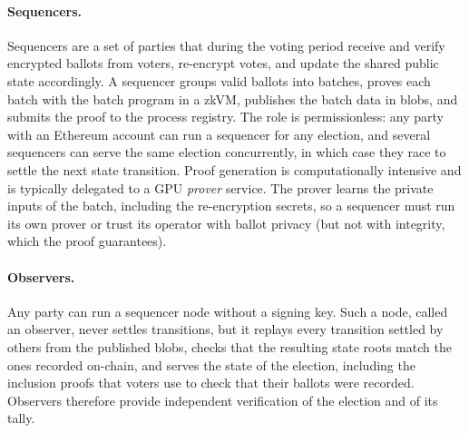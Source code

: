 \paragraph{Sequencers.} Sequencers are a set of parties that during the voting period receive and verify encrypted ballots from voters, re-encrypt votes, and update the shared public state accordingly. A sequencer groups valid ballots into batches, proves each batch with the batch program in a \ac{zkVM}, publishes the batch data in blobs, and submits the proof to the process registry. The role is permissionless: any party with an Ethereum account can run a sequencer for any election, and several sequencers can serve the same election concurrently, in which case they race to settle the next state transition. Proof generation is computationally intensive and is typically delegated to a GPU \emph{prover} service. The prover learns the private inputs of the batch, including the re-encryption secrets, so a sequencer must run its own prover or trust its operator with ballot privacy (but not with integrity, which the proof guarantees).

\paragraph{Observers.} Any party can run a sequencer node without a signing key. Such a node, called an observer, never settles transitions, but it replays every transition settled by others from the published blobs, checks that the resulting state roots match the ones recorded on-chain, and serves the state of the election, including the inclusion proofs that voters use to check that their ballots were recorded. Observers therefore provide independent verification of the election and of its tally.
